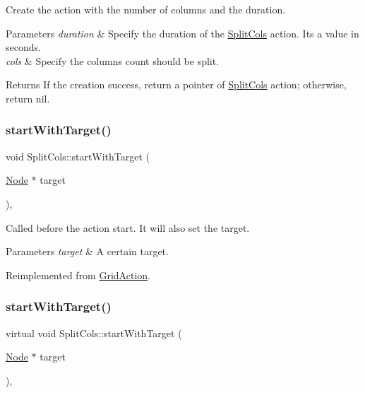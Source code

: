 Create the action with the number of columns and the duration. 


\begin{DoxyParams}{Parameters}
{\em duration} & Specify the duration of the \hyperlink{classSplitCols}{Split\+Cols} action. It\textquotesingle{}s a value in seconds. \\
\hline
{\em cols} & Specify the columns count should be split. \\
\hline
\end{DoxyParams}
\begin{DoxyReturn}{Returns}
If the creation success, return a pointer of \hyperlink{classSplitCols}{Split\+Cols} action; otherwise, return nil. 
\end{DoxyReturn}
\mbox{\label{classSplitCols_a6378035983a5b7f31ea3f3e2638a750c}} 
\subsubsection{\texorpdfstring{start\+With\+Target()}{startWithTarget()}\hspace{0.1cm}{\footnotesize\ttfamily [1/2]}}
{\footnotesize\ttfamily void Split\+Cols\+::start\+With\+Target (\begin{DoxyParamCaption}\item[{\hyperlink{classNode}{Node} $\ast$}]{target }\end{DoxyParamCaption})\hspace{0.3cm}{\ttfamily [override]}, {\ttfamily [virtual]}}

Called before the action start. It will also set the target.


\begin{DoxyParams}{Parameters}
{\em target} & A certain target. \\
\hline
\end{DoxyParams}


Reimplemented from \hyperlink{classGridAction_a33e2c1bc95bbcf6b16428097b4fd4b61}{Grid\+Action}.

\mbox{\label{classSplitCols_ae9600d8beda7affc5d8eb29624978698}} 
\subsubsection{\texorpdfstring{start\+With\+Target()}{startWithTarget()}\hspace{0.1cm}{\footnotesize\ttfamily [2/2]}}
{\footnotesize\ttfamily virtual void Split\+Cols\+::start\+With\+Target (\begin{DoxyParamCaption}\item[{\hyperlink{classNode}{Node} $\ast$}]{target }\end{DoxyParamCaption})\hspace{0.3cm}{\ttfamily [override]}, {\ttfamily [virtual]}}

